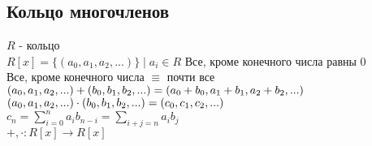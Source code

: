 \subsection{Кольцо многочленов}

\begin{definition}
	$ R $ - кольцо \\
	$ R[x] = \{ (a_0, a_1, a_2, ...) \}  \mid a_i \in R $ Все, кроме конечного числа равны 0 \\
	Все, кроме конечного числа $ \equiv $ почти все \\
	$ (a_0, a_1, a_2, ... ) + \\
	(b_0, b_1, b_2, ...) = \\
	(a_0 + b_0, a_1 + b_1, a_2+b_2, ...) $ \\
	$ (a_0, a_1, a_2, ... ) \cdot \\
	(b_0, b_1, b_2, ...) = \\
	(c_0,c_1, c_2, ...) $ \\
	$ c_n = \sum_{i=0}^{n} a_i b_{n-i} = \sum_{i+j=n} a_i b_j $ \\
	$ +, \cdot : R[x] \rightarrow R[x] $
\end{definition}
